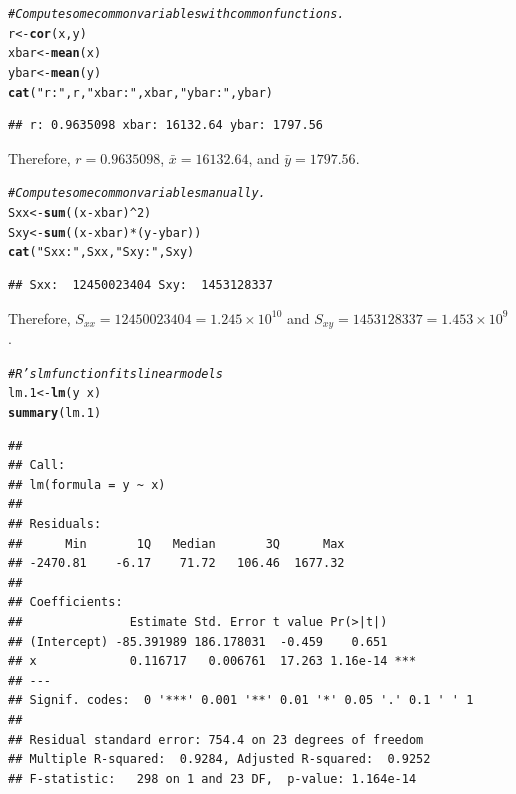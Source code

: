 \documentclass[oneside]{book}\usepackage[]{graphicx}\usepackage[dvipsnames,table,xcdraw]{xcolor}
\makeatletter
\newcommand{\hlnum}[1]{\textcolor[rgb]{0.686,0.059,0.569}{#1}}%
\newcommand{\hlstr}[1]{\textcolor[rgb]{0.192,0.494,0.8}{#1}}%
\newcommand{\hlcom}[1]{\textcolor[rgb]{0.678,0.584,0.686}{\textit{#1}}}%
\newcommand{\hlopt}[1]{\textcolor[rgb]{0,0,0}{#1}}%
\newcommand{\hlstd}[1]{\textcolor[rgb]{0.345,0.345,0.345}{#1}}%
\newcommand{\hlkwb}[1]{\textcolor[rgb]{0.69,0.353,0.396}{#1}}%
\newcommand{\hlkwd}[1]{\textcolor[rgb]{0.737,0.353,0.396}{\textbf{#1}}}%
\newenvironment{kframe}{%
 \def\at@end@of@kframe{}%
 \ifinner\ifhmode%
  \def\at@end@of@kframe{\end{minipage}}%
  \begin{minipage}{\columnwidth}%
 \fi\fi%
 \def\FrameCommand##1{\hskip\@totalleftmargin \hskip-\fboxsep
 \colorbox{shadecolor}{##1}\hskip-\fboxsep
     \hskip-\linewidth \hskip-\@totalleftmargin \hskip\columnwidth}%
 \MakeFramed {\advance\hsize-\width
   \@totalleftmargin\z@ \linewidth\hsize
   \@setminipage}}%
 {\par\unskip\endMakeFramed%
 \at@end@of@kframe}
\newenvironment{knitrout}{}{} %
\makeatother
\begin{document}
\begin{knitrout}
{}


\begin{kframe}\begin{alltt}
\hlcom{# Compute some common variables with common functions.}
\hlstd{r} \hlkwb{<-} \hlkwd{cor}\hlstd{(x, y)}
\hlstd{xbar} \hlkwb{<-} \hlkwd{mean}\hlstd{(x)}
\hlstd{ybar} \hlkwb{<-} \hlkwd{mean}\hlstd{(y)}
\hlkwd{cat}\hlstd{(}\hlstr{"r:"}\hlstd{, r,} \hlstr{"xbar:"}\hlstd{, xbar,} \hlstr{"ybar:"}\hlstd{, ybar)}
\end{alltt}
\begin{verbatim}
## r: 0.9635098 xbar: 16132.64 ybar: 1797.56
\end{verbatim}
\end{kframe}
\end{knitrout}

Therefore, $r=0.9635098$,
$\bar{x}=16132.64$, and $\bar{y}= 1797.56$.

\begin{knitrout}
\color{fgcolor}\begin{kframe}
\begin{alltt}
\hlcom{# Compute some common variables manually.}
\hlstd{Sxx} \hlkwb{<-} \hlkwd{sum}\hlstd{((x} \hlopt{-} \hlstd{xbar)}\hlopt{^}\hlnum{2}\hlstd{)}
\hlstd{Sxy} \hlkwb{<-} \hlkwd{sum}\hlstd{((x} \hlopt{-} \hlstd{xbar)} \hlopt{*} \hlstd{(y} \hlopt{-} \hlstd{ybar))}
\hlkwd{cat}\hlstd{(}\hlstr{"Sxx: "}\hlstd{, Sxx,} \hlstr{"Sxy: "}\hlstd{, Sxy)}
\end{alltt}
\begin{verbatim}
## Sxx:  12450023404 Sxy:  1453128337
\end{verbatim}
\end{kframe}
\end{knitrout}

Therefore, $S_{xx}=12450023404=1.245\times10^{10}$ and
$S_{xy}=1453128337=1.453\times 10^{9}$.

\begin{knitrout}
\color{fgcolor}\begin{kframe}
\begin{alltt}
\hlcom{# R's lm function fits linear models}
\hlstd{lm.1} \hlkwb{<-} \hlkwd{lm}\hlstd{(y} \hlopt{~} \hlstd{x)}
\hlkwd{summary}\hlstd{(lm.1)}
\end{alltt}
\begin{verbatim}
## 
## Call:
## lm(formula = y ~ x)
## 
## Residuals:
##      Min       1Q   Median       3Q      Max 
## -2470.81    -6.17    71.72   106.46  1677.32 
## 
## Coefficients:
##               Estimate Std. Error t value Pr(>|t|)    
## (Intercept) -85.391989 186.178031  -0.459    0.651    
## x             0.116717   0.006761  17.263 1.16e-14 ***
## ---
## Signif. codes:  0 '***' 0.001 '**' 0.01 '*' 0.05 '.' 0.1 ' ' 1
## 
## Residual standard error: 754.4 on 23 degrees of freedom
## Multiple R-squared:  0.9284,	Adjusted R-squared:  0.9252 
## F-statistic:   298 on 1 and 23 DF,  p-value: 1.164e-14
\end{verbatim}
\end{kframe}
\end{knitrout}
\end{document}
